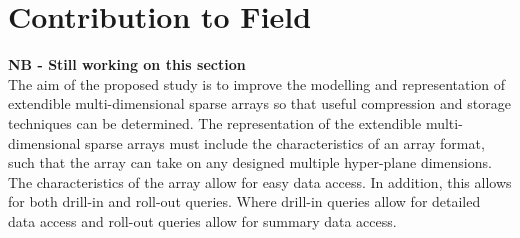 \section{Contribution to Field}
\textbf{NB - Still working on this section}\\
The aim of the proposed study is to improve the modelling and representation of extendible multi-dimensional sparse arrays so that useful compression and storage techniques can be determined. The representation of the extendible multi-dimensional sparse arrays must include the characteristics of an array format, such that the array can take on any designed multiple hyper-plane dimensions. The characteristics of the array allow for easy data access. In addition, this allows for both drill-in and roll-out queries. Where drill-in queries allow for detailed data access and roll-out queries allow for summary data access.

